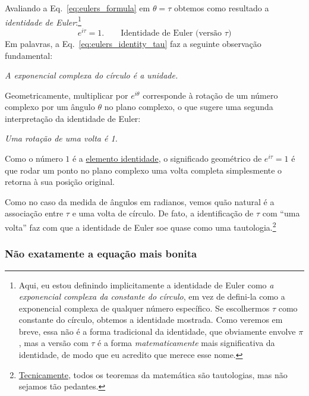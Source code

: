 {Avaliando a Eq.~\eqref{eq:eulers_formula} em $\theta = \tau$ obtemos como resultado a \emph{identidade de Euler}:\footnote{Aqui, eu estou definindo implicitamente a identidade de Euler como \emph{a exponencial complexa da constante do círculo}, em vez de defini-la como a exponencial complexa de qualquer número específico. Se escolhermos $\tau$ como constante do círculo, obtemos a identidade mostrada. Como veremos em breve, essa não é a forma tradicional da identidade, que obviamente envolve $\pi$, mas a versão com $\tau$ é a forma \emph{matematicamente} mais significativa da identidade, de modo que eu acredito que merece esse nome.}
\begin{equation}
\label{eq:eulers_identity_tau}
e^{i\tau} = 1. \qquad\mbox{Identidade de Euler (versão $\tau$)}
\end{equation}
Em palavras, a Eq.~\eqref{eq:eulers_identity_tau} faz a seguinte observação fundamental:

\begin{center}
\emph{A exponencial complexa do círculo é a unidade.}
\end{center}

Geometricamente, multiplicar por $e^{i\theta}$ corresponde à rotação de um número complexo por um ângulo $\theta$ no plano complexo, o que sugere uma segunda interpretação da identidade de Euler:

\begin{center}
\emph{Uma rotação de uma volta é 1.}
\end{center}

\noindent Como o número $1$ é a \href{https://pt.wikipedia.org/wiki/Elemento_neutro}{elemento identidade}, o significado geométrico de $e^{i\tau} = 1$ é que rodar um ponto no plano complexo uma volta completa simplesmente o retorna à sua posição original.

Como no caso da medida de ângulos em radianos, vemos quão natural é a associação entre $\tau$ e uma volta de círculo. De fato, a identificação de $\tau$ com ``uma volta'' faz com que a identidade de Euler soe quase como uma tautologia.\footnote{\href{https://xkcd.com/1475/}{Tecnicamente}, todos os teoremas da matemática são tautologias, mas não sejamos tão pedantes.}

    \subsubsection{Não exatamente a equação mais bonita} %
    \label{sec:not_the_most_beautiful_equation}

}

